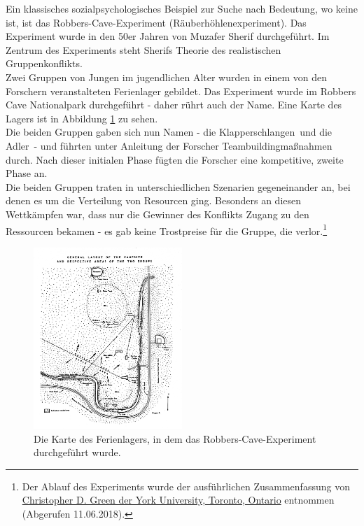 Ein klassisches sozialpsychologisches Beispiel zur Suche nach Bedeutung, wo keine ist, ist das Robbers-Cave-Experiment (Räuberhöhlenexperiment). Das Experiment wurde in den 50er Jahren von Muzafer Sherif durchgeführt.\cite{SHE61} Im Zentrum des Experiments steht Sherifs Theorie des realistischen Gruppenkonflikts. \\

Zwei Gruppen von Jungen im jugendlichen Alter wurden in einem von den Forschern veranstalteten Ferienlager gebildet. Das Experiment wurde im Robbers Cave Nationalpark durchgeführt - daher rührt auch der Name. Eine Karte des Lagers ist in Abbildung \ref{fig:robbers-cave-map} zu sehen.\\

Die beiden Gruppen gaben sich nun Namen - die \glqq Klapperschlangen\grqq~und die \glqq Adler\grqq~- und führten unter Anleitung der Forscher Teambuildingmaßnahmen durch. Nach dieser initialen Phase fügten die Forscher eine kompetitive, zweite Phase an. \\

Die beiden Gruppen traten in unterschiedlichen Szenarien gegeneinander an, bei denen es um die Verteilung von Resourcen ging. Besonders an diesen Wettkämpfen war, dass nur die Gewinner des Konflikts Zugang zu den Ressourcen bekamen - es gab keine Trostpreise für die Gruppe, die verlor.\footnote{Der Ablauf des Experiments wurde der ausführlichen Zusammenfassung von \href{http://livros01.livrosgratis.com.br/ps000162.pdf}{Christopher D. Green der York University, Toronto, Ontario} entnommen (Abgerufen 11.06.2018).} \\ 

 \begin{figure}[htbp]
	\begin{center}
		\includegraphics[width=0.5\textwidth]{Bilder/robbers-cave-map.jpg}
		\caption{Die Karte des Ferienlagers, in dem das Robbers-Cave-Experiment durchgeführt wurde.}
		\label{fig:robbers-cave-map}
	\end{center}
\end{figure}

